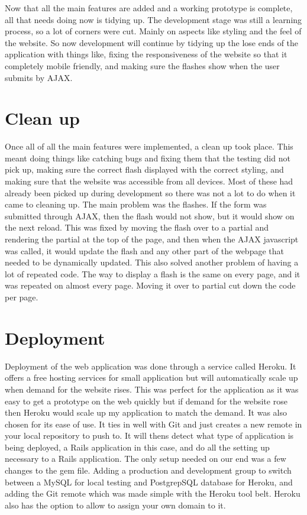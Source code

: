Now that all the main features are added and a working prototype is complete, all that needs doing now is tidying up. The development stage was still a learning process, so a lot of corners were cut. Mainly on aspects like styling and the feel of the website. So now development will continue by tidying up the lose ends of the application with things like, fixing the responsiveness of the website so that it completely mobile friendly, and making sure the flashes show when the user submits by AJAX.\\

\section{Clean up}
Once all of all the main features were implemented, a clean up took place. This meant doing things like catching bugs and fixing them that the testing did not pick up, making sure the correct flash displayed with the correct styling, and making sure that the website was accessible from all devices. Most of these had already been picked up during development so there was not a lot to do when it came to cleaning up. The main problem was the flashes. If the form was submitted through AJAX, then the flash would not show, but it would show on the next reload. This was fixed by moving the flash over to a partial and rendering the partial at the top of the page, and then when the AJAX javascript was called, it would update the flash and any other part of the webpage that needed to be dynamically updated. This also solved another problem of having a lot of repeated code. The way to display a flash is the same on every page, and it was repeated on almost every page. Moving it over to partial cut down the code per page.\\

\section{Deployment}
\label{sec:deployment}
Deployment of the web application was done through a service called Heroku. It offers a free hosting services for small application but will automatically scale up when demand for the website rises. This was perfect for the application as it was easy to get a prototype on the web quickly but if demand for the website rose then Heroku would scale up my application to match the demand. It was also chosen for its ease of use. It ties in well with Git and just creates a new remote in your local repository to push to. It will thens detect what type of application is being deployed, a Rails application in this case, and do all the setting up necessary to a Rails application. The only setup needed on our end was a few changes to the gem file. Adding a production and development group to switch between a MySQL \citep{mysql:1995} for local testing and PostgrepSQL \citep{postgres:1995} database for Heroku, and adding the Git remote which was made simple with the Heroku tool belt. Heroku also has the option to allow to assign your own domain to it.\\

